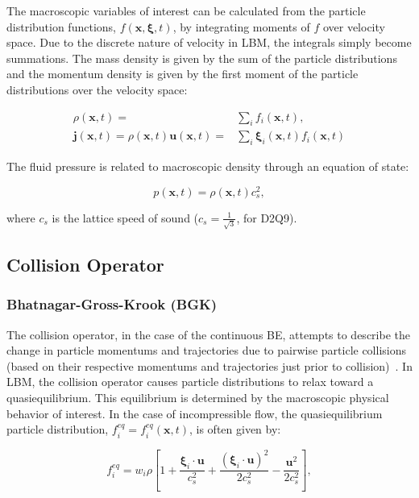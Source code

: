 \documentclass[pdftex,ms]{pittetd}
\newcommand{\pos}{\mathbf{x}}
\newcommand{\pvel}{\boldsymbol{\xi}}
\newcommand{\mvel}{\mathbf{u}}
\newcommand{\mmom}{\mathbf{j}}
\begin{document}
The macroscopic variables of interest can be calculated from the particle distribution functions, $f(\pos, \pvel, t)$, by integrating moments of $f$ over velocity space.
Due to the discrete nature of velocity in LBM, the integrals simply become summations.
The mass density is given by the sum of the particle distributions and the momentum density is given by the first moment of the particle distributions over the velocity space:

\begin{align}
\label{eq:rho} \rho(\pos, t) =& \sum_{i} f_i(\pos, t), \\
\label{eq:mom} \mmom(\pos, t) = \rho(\pos, t) \mvel(\pos, t) =& \sum_{i} \pvel_i(\pos, t) f_i(\pos, t)
\end{align}

\noindent The fluid pressure is related to macroscopic density through an equation of state:

\begin{equation}
\label{eq:pres} p(\pos, t) = \rho(\pos, t) c_s^2,
\end{equation}

\noindent where $c_s$ is the lattice speed of sound ($c_s = \frac{1}{\sqrt{3}}$, for D2Q9).

\subsection{Collision Operator}

\subsubsection{Bhatnagar-Gross-Krook (BGK)} \label{sec:bgk}

The collision operator, in the case of the continuous BE, attempts to describe the change in particle momentums and trajectories due to pairwise particle collisions (based on their respective momentums and trajectories just prior to collision)~\cite{Cer90}.
In LBM, the collision operator causes particle distributions to relax toward a quasiequilibrium. %
This equilibrium is determined by the macroscopic physical behavior of interest.
In the case of incompressible flow, the quasiequilibrium particle distribution, $f_i^{eq} = f_i^{eq}(\pos, t)$, is often given by:

\begin{equation} \label{eq:feq}
  f_i^{eq} = w_i \rho \left[1 + \frac{\pvel_i \cdot \mvel}{c_s^2} + \frac{(\pvel_i \cdot \mvel)^2}{2c_s^2} - \frac{\mvel^2}{2c_s^2} \right],
\end{equation}
\end{document}

